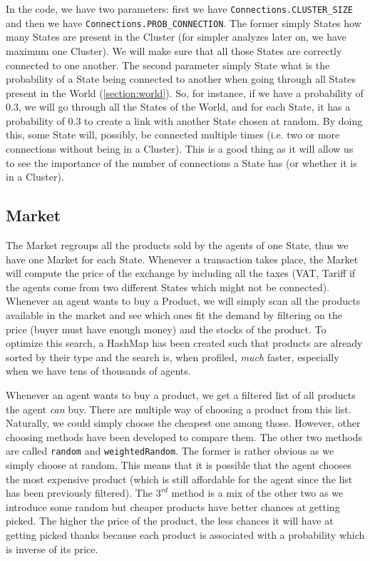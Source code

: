     In the code, we have two parameters: first we have \texttt{Connections.CLUSTER\_SIZE} and then we have \texttt{Connections.PROB\_CONNECTION}. The former simply States how many States are present in the Cluster (for simpler analyzes later on, we have maximum one Cluster). We will make sure that all those States are correctly connected to one another. The second parameter simply State what is the probability of a State being connected to another when going through all States present in the World (\ref{section:world}). So, for instance, if we have a probability of 0.3, we will go through all the States of the World, and for each State, it has a probability of 0.3 to create a link with another State chosen at random. By doing this, some State will, possibly, be connected multiple times (i.e. two or more connections without being in a Cluster). This is a good thing as it will allow us to see the importance of the number of connections a State has (or whether it is in a Cluster).


\subsection{Market}\label{section:market}
The Market regroups all the products sold by the agents of one State, thus we have one Market for each State. Whenever a transaction takes place, the Market will compute the price of the exchange by including all the taxes (VAT, Tariff if the agents come from two different States which might not be connected). Whenever an agent wants to buy a Product, we will simply scan all the products available in the market and see which ones fit the demand by filtering on the price (buyer must have enough money) and the stocks of the product. To optimize this search, a HashMap has been created such that products are already sorted by their type and the search is, when profiled, \emph{much} faster, especially when we have tens of thousands of agents.

Whenever an agent wants to buy a product, we get a filtered list of all products the agent \emph{can} buy. There are multiple way of choosing a product from this list. Naturally, we could simply choose the cheapest one among those. However, other choosing methods have been developed to compare them. The other two methods are called \texttt{random} and \texttt{weightedRandom}. The former is rather obvious as we simply choose at random. This means that it is possible that the agent chooses the most expensive product (which is still affordable for the agent since the list has been previously filtered). The $3^{rd}$ method is a mix of the other two as we introduce some random but cheaper products have better chances at getting picked. The higher the price of the product, the less chances it will have at getting picked thanks because each product is associated with a probability which is inverse of its price.

